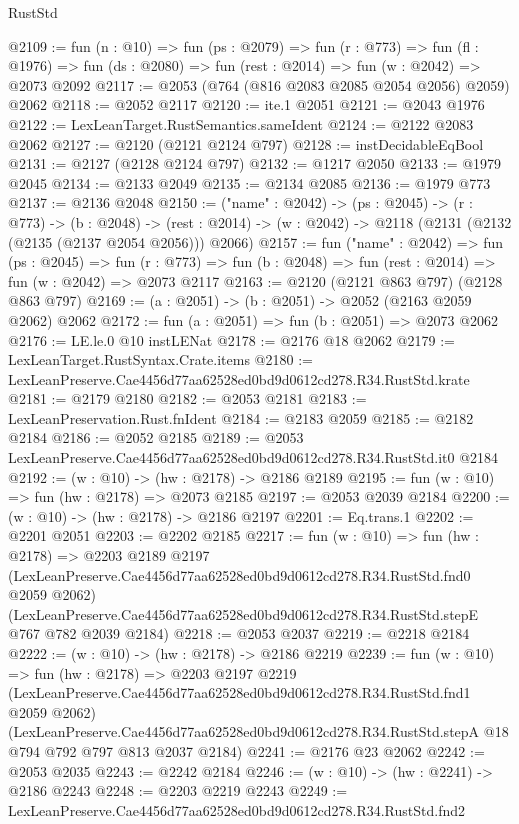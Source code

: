 \begin{lexlean}{RustStd}
\begin{coremodule}
@2109 := fun (n : @10) =>
  fun (ps : @2079) =>
  fun (r : @773) =>
  fun (fl : @1976) => fun (ds : @2080) => fun (rest : @2014) => fun (w : @2042) => @2073 @2092
@2117 := @2053 (@764 (@816 @2083 @2085 @2054 @2056) @2059) @2062
@2118 := @2052 @2117
@2120 := ite.{1} @2051
@2121 := @2043 @1976
@2122 := LexLeanTarget.RustSemantics.sameIdent
@2124 := @2122 @2083 @2062
@2127 := @2120 (@2121 @2124 @797)
@2128 := instDecidableEqBool
@2131 := @2127 (@2128 @2124 @797)
@2132 := @1217 @2050
@2133 := @1979 @2045
@2134 := @2133 @2049
@2135 := @2134 @2085
@2136 := @1979 @773
@2137 := @2136 @2048
@2150 := ("name" : @2042) ->
  (ps : @2045) ->
  (r : @773) ->
  (b : @2048) ->
  (rest : @2014) -> (w : @2042) -> @2118 (@2131 (@2132 (@2135 (@2137 @2054 @2056))) @2066)
@2157 := fun ("name" : @2042) =>
  fun (ps : @2045) =>
  fun (r : @773) => fun (b : @2048) => fun (rest : @2014) => fun (w : @2042) => @2073 @2117
@2163 := @2120 (@2121 @863 @797) (@2128 @863 @797)
@2169 := (a : @2051) -> (b : @2051) -> @2052 (@2163 @2059 @2062) @2062
@2172 := fun (a : @2051) => fun (b : @2051) => @2073 @2062
@2176 := LE.le.{0} @10 instLENat
@2178 := @2176 @18 @2062
@2179 := LexLeanTarget.RustSyntax.Crate.items
@2180 := LexLeanPreserve.Cae4456d77aa62528ed0bd9d0612cd278.R34.RustStd.krate
@2181 := @2179 @2180
@2182 := @2053 @2181
@2183 := LexLeanPreservation.Rust.fnIdent
@2184 := @2183 @2059
@2185 := @2182 @2184
@2186 := @2052 @2185
@2189 := @2053 LexLeanPreserve.Cae4456d77aa62528ed0bd9d0612cd278.R34.RustStd.it0 @2184
@2192 := (w : @10) -> (hw : @2178) -> @2186 @2189
@2195 := fun (w : @10) => fun (hw : @2178) => @2073 @2185
@2197 := @2053 @2039 @2184
@2200 := (w : @10) -> (hw : @2178) -> @2186 @2197
@2201 := Eq.trans.{1}
@2202 := @2201 @2051
@2203 := @2202 @2185
@2217 := fun (w : @10) =>
  fun (hw : @2178) =>
  @2203
    @2189
    @2197
    (LexLeanPreserve.Cae4456d77aa62528ed0bd9d0612cd278.R34.RustStd.fnd0 @2059 @2062)
    (LexLeanPreserve.Cae4456d77aa62528ed0bd9d0612cd278.R34.RustStd.stepE @767 @782 @2039 @2184)
@2218 := @2053 @2037
@2219 := @2218 @2184
@2222 := (w : @10) -> (hw : @2178) -> @2186 @2219
@2239 := fun (w : @10) =>
  fun (hw : @2178) =>
  @2203
    @2197
    @2219
    (LexLeanPreserve.Cae4456d77aa62528ed0bd9d0612cd278.R34.RustStd.fnd1 @2059 @2062)
    (LexLeanPreserve.Cae4456d77aa62528ed0bd9d0612cd278.R34.RustStd.stepA
      @18
      @794
      @792
      @797
      @813
      @2037
      @2184)
@2241 := @2176 @23 @2062
@2242 := @2053 @2035
@2243 := @2242 @2184
@2246 := (w : @10) -> (hw : @2241) -> @2186 @2243
@2248 := @2203 @2219 @2243
@2249 := LexLeanPreserve.Cae4456d77aa62528ed0bd9d0612cd278.R34.RustStd.fnd2

\end{coremodule}
\end{lexlean}
